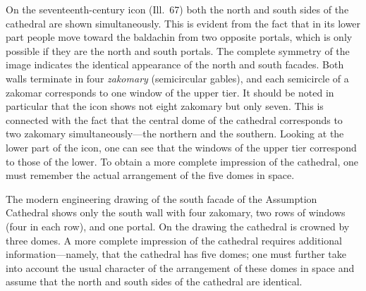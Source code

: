 
On the seventeenth-century icon (Ill.~67) both the north and south sides of the cathedral
are shown simultaneously.  This is evident from the fact that in its lower part people
move toward the baldachin from two opposite portals, which is only possible if they are
the north and south portals.  The complete symmetry of the image indicates the identical
appearance of the north and south facades.  Both walls terminate in four \emph{zakomary}
(semicircular gables), and each semicircle of a zakomar corresponds to one window of the
upper tier.  It should be noted in particular that the icon shows not eight zakomary but
only seven.  This is connected with the fact that the central dome of the cathedral
corresponds to two zakomary simultaneously---the northern and the southern.  Looking at
the lower part of the icon, one can see that the windows of the upper tier correspond to
those of the lower.  To obtain a more complete impression of the cathedral, one must
remember the actual arrangement of the five domes in space.

The modern engineering drawing of the south facade of the Assumption Cathedral shows only
the south wall with four zakomary, two rows of windows (four in each row), and one portal.
On the drawing the cathedral is crowned by three domes.  A more complete impression of
the cathedral requires additional information---namely, that the cathedral has five domes;
one must further take into account the usual character of the arrangement of these domes
in space and assume that the north and south sides of the cathedral are identical.

